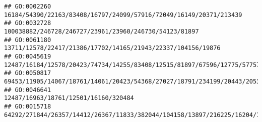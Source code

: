 \documentclass[
]{article}
\begin{document}
\begin{verbatim}
## GO:0002260                                                                                                                                                                                                                                                                                                                                           16184/54390/22163/83408/16797/24099/57916/72049/16149/20371/213439
## GO:0032728                                                                                                                                                                                                                                                                                                                                                       100038882/246728/246727/23961/23960/246730/54123/81897
## GO:0061180                                                                                                                                                                                                                                                                                                                                                 13711/12578/22417/21386/17702/14165/21943/22337/104156/19876
## GO:0045619                                                                                                                                                                                                                                                                                                  12487/16184/12578/20423/74734/14255/83408/12515/81897/67596/12775/57757/15001/14998/14960/16149/20371/16186
## GO:0050817                                                                                                                                                                                                                                                                                                         69453/11905/14067/18761/14061/20423/54368/27027/18791/234199/20443/20533/71753/15160/100503895/11551
## GO:0046641                                                                                                                                                                                                                                                                                                                                                                         12487/16963/18761/12501/16160/320484
## GO:0015718                                                                                                                                                                                                                                                                                                          64292/271844/26357/14412/26367/11833/382044/104158/13897/216225/16204/18126/76408/21943/20519/12780

\end{verbatim}
\end{document}
